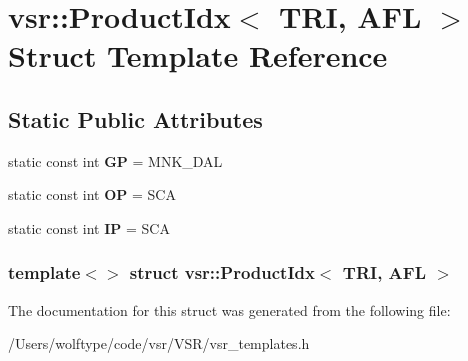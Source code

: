 \hypertarget{structvsr_1_1_product_idx_3_01_t_r_i_00_01_a_f_l_01_4}{\section{vsr\-:\-:Product\-Idx$<$ T\-R\-I, A\-F\-L $>$ Struct Template Reference}
\label{structvsr_1_1_product_idx_3_01_t_r_i_00_01_a_f_l_01_4}
}
\subsection*{Static Public Attributes}
\begin{DoxyCompactItemize}
\item 
\hypertarget{structvsr_1_1_product_idx_3_01_t_r_i_00_01_a_f_l_01_4_a76f3a5571d364520ab6de481f54472a5}{static const int {\bfseries G\-P} = M\-N\-K\-\_\-\-D\-A\-L}\label{structvsr_1_1_product_idx_3_01_t_r_i_00_01_a_f_l_01_4_a76f3a5571d364520ab6de481f54472a5}

\item 
\hypertarget{structvsr_1_1_product_idx_3_01_t_r_i_00_01_a_f_l_01_4_a8f803080716c5a6a21b3ecc6dee860f9}{static const int {\bfseries O\-P} = S\-C\-A}\label{structvsr_1_1_product_idx_3_01_t_r_i_00_01_a_f_l_01_4_a8f803080716c5a6a21b3ecc6dee860f9}

\item 
\hypertarget{structvsr_1_1_product_idx_3_01_t_r_i_00_01_a_f_l_01_4_a950471fd4673848fb974848822ecc42b}{static const int {\bfseries I\-P} = S\-C\-A}\label{structvsr_1_1_product_idx_3_01_t_r_i_00_01_a_f_l_01_4_a950471fd4673848fb974848822ecc42b}

\end{DoxyCompactItemize}
\subsubsection*{template$<$$>$ struct vsr\-::\-Product\-Idx$<$ T\-R\-I, A\-F\-L $>$}



The documentation for this struct was generated from the following file\-:\begin{DoxyCompactItemize}
\item 
/\-Users/wolftype/code/vsr/\-V\-S\-R/vsr\-\_\-templates.\-h\end{DoxyCompactItemize}
